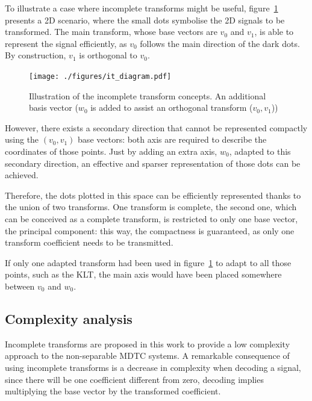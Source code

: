 \documentclass[11pt,a4paper,openright,twoside]{book}
\def\usepdfs{1} %
\numberwithin{equation}{section} %
\numberwithin{figure}{section} %
\numberwithin{table}{section} %
\begin{document}
To illustrate a case where incomplete transforms might be useful,
figure~\ref{fig:it_diagram} presents a 2D scenario, where the small dots
symbolise the 2D signals to be transformed.
The main transform, whose base vectors are $v_0$ and $v_1$, is able to
represent the signal efficiently, as $v_0$ follows the main direction of the
dark dots.
By construction, $v_1$ is orthogonal to $v_0$.

\begin{figure}[tp]
	\centering
	\ifthenelse{\usepdfs = 0}
	{}
	{\texttt{[image: ./figures/it\_diagram.pdf]}}
	\caption[Illustration of the incomplete transform concepts]
	{Illustration of the incomplete transform concepts.
	An additional basis vector ($w_0$ is added to assist an orthogonal
	transform ($v_0,v_1$))}
	\label{fig:it_diagram}
\end{figure}

However, there exists a secondary direction that cannot be represented
compactly using the $(v_0,v_1)$ base vectors:
both axis are required to describe the coordinates of those points.
Just by adding an extra axis, $w_0$, adapted to this secondary direction, an
effective and sparser representation of those dots can be achieved.

Therefore, the dots plotted in this space can be efficiently represented thanks
to the union of two transforms.
One transform is complete, the second one, which can be conceived as a
complete transform, is restricted to only one base vector, the principal
component:
this way, the compactness is guaranteed, as only one transform coefficient
needs to be transmitted.

If only one adapted transform had been used in figure~\ref{fig:it_diagram}
to adapt to all those points, such as the \acl{KLT}, the main axis would have
been placed somewhere between $v_0$ and $w_0$.

\subsection{Complexity analysis}
\label{sub:it_complexity_analysis}

Incomplete transforms are proposed in this work to provide a low complexity
approach to the non-separable \ac{MDTC} systems.
A remarkable consequence of using incomplete transforms is a decrease in
complexity when decoding a signal, since there will be one coefficient
different from zero, decoding implies multiplying the base vector by the
transformed coefficient.
\end{document}
